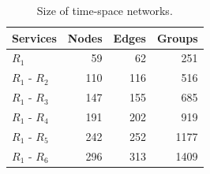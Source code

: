 \begin{table}[width=.9\linewidth,cols=4,pos=h]
\caption{Size of time-space networks.}\label{tab:BigSize2}
\begin{tabular*}{\tblwidth}{@{} LRRR @{} }
\toprule
Services&Nodes&Edges&Groups\\
\midrule
        $R_1$ &  59 &  62 & 251\\
$R_1$ - $R_2$ & 110 & 116 & 516\\
$R_1$ - $R_3$ & 147 & 155 & 685\\
$R_1$ - $R_4$ & 191 & 202 & 919\\
$R_1$ - $R_5$ & 242 & 252 &1177\\
$R_1$ - $R_6$ & 296 & 313 &1409\\
\bottomrule
\end{tabular*}
\end{table}

